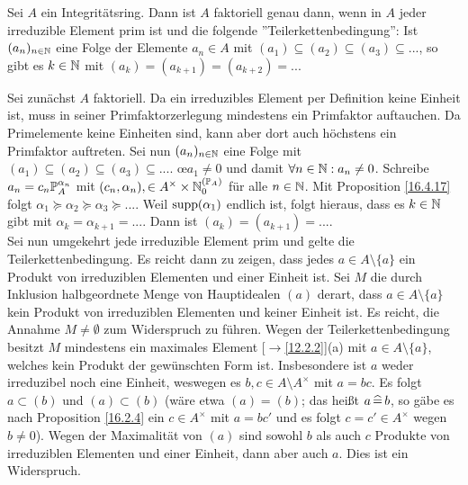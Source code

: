 \documentclass[../../main.tex]{subfiles}
\begin{document}
\begin{sat}\label{16.4.18}
Sei $A$ ein Integritätsring. Dann ist $A$ faktoriell genau dann, wenn in $A$ jeder irreduzible Element prim ist und die folgende ''Teilerkettenbedingung'': Ist $(a_n)_{n\in \N}$ eine Folge der Elemente $a_n\in A$ mit $(a_1)\subseteq (a_2)\subseteq(a_3)\subseteq...$, so gibt es $k\in \N$ mit $(a_k)=(a_{k+1})=(a_{k+2})=...$
\end{sat}
\begin{cproof}
Sei zunächst $A$ faktoriell. Da ein irreduzibles Element per Definition keine Einheit ist, muss in seiner Primfaktorzerlegung mindestens ein Primfaktor auftauchen. Da Primelemente keine Einheiten sind, kann aber dort auch höchstens ein Primfaktor auftreten. Sei nun $(a_n)_{n\in \N}$ eine Folge mit $(a_1)\subseteq (a_2)\subseteq(a_3)\subseteq...$. \oe $a_1\neq 0$ und damit $\forall n\in \N: a_n\neq 0$. Schreibe $a_n=c_n\P_A^{\alpha_n}$ mit $(c_n,\alpha_n),\in A^\times\times \N_0^{(\P_A)}$ für alle $n\in \N$. Mit Proposition \ref{16.4.17} folgt $\alpha_1\succeq\alpha_2\succeq\alpha_3\succeq...$. Weil $\supp(\alpha_1)$ endlich ist, folgt hieraus, dass es $k\in \N$ gibt mit $\alpha_k=\alpha_{k+1}=...$. Dann ist $(a_k)=(a_{k+1})=...$.\\

\noindent Sei nun umgekehrt jede irreduzible Element prim und gelte die Teilerkettenbedingung. Es reicht dann zu zeigen, dass jedes $a\in A\setminus\{a\}$ ein Produkt von irreduziblen Elementen und einer Einheit ist. Sei $M$ die durch Inklusion halbgeordnete Menge von Hauptidealen $(a)$ derart, dass $a\in A\setminus\{a\}$ kein Produkt von irreduziblen Elementen und keiner Einheit ist. Es reicht, die Annahme $M\neq \emptyset$ zum Widerspruch zu führen. Wegen der Teilerkettenbedingung besitzt $M$ mindestens ein maximales Element [$\to$\ref{12.2.2}](a) mit $a\in A\setminus\{a\}$, welches kein Produkt der gewünschten Form ist. Insbesondere ist $a$ weder irreduzibel noch eine Einheit, weswegen es $b,c\in A\setminus A^\times$ mit $a=bc$. Es folgt $a\subset(b)$ und $(a)\subset (b)$ (wäre etwa $(a)=(b)$; das heißt $a\divi b$, so gäbe es nach Proposition \ref{16.2.4} ein $c\in A^\times$ mit $a=bc'$ und es folgt $c=c'\in A^\times$ wegen $b\neq 0$). Wegen der Maximalität von $(a)$ sind sowohl $b$ als auch $c$ Produkte von irreduziblen Elementen und einer Einheit, dann aber auch $a$. Dies ist ein Widerspruch.
\end{cproof}
\end{document}

